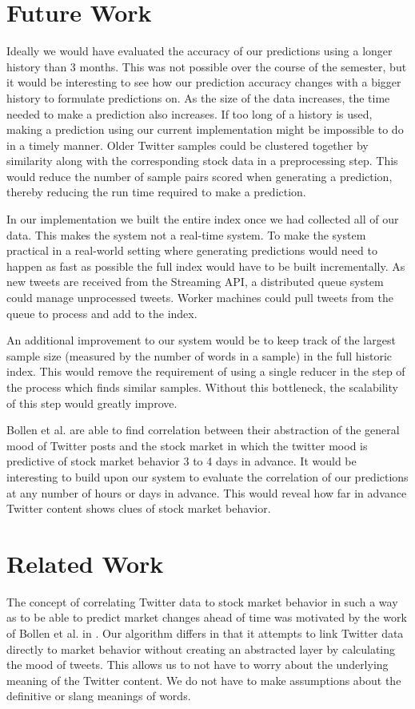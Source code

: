 \documentclass[twocolumn]{article}
\begin{document}
\section{Future Work}
Ideally we would have evaluated the accuracy of our predictions using a longer history than 3 months. This was not possible over the course of the semester, but it would be interesting to see how our prediction accuracy changes with a bigger history to formulate predictions on. As the size of the data increases, the time needed to make a prediction also increases. If too long of a history is used, making a prediction using our current implementation might be impossible to do in a timely manner. Older Twitter samples could be clustered together by similarity along with the corresponding stock data in a preprocessing step. This would reduce the number of sample pairs scored when generating a prediction, thereby reducing the run time required to make a prediction.

In our implementation we built the entire index once we had collected all of our data. This makes the system not a real-time system. To make the system practical in a real-world setting where generating predictions would need to happen as fast as possible the full index would have to be built incrementally. As new tweets are received from the Streaming API, a distributed queue system could manage unprocessed tweets. Worker machines could pull tweets from the queue to process and add to the index.

An additional improvement to our system would be to keep track of the largest sample size (measured by the number of words in a sample) in the full historic index. This would remove the requirement of using a single reducer in the step of the process which finds similar samples. Without this bottleneck, the scalability of this step would greatly improve.

Bollen et al. are able to find correlation between their abstraction of the general mood of Twitter posts and the stock market in which the twitter mood is predictive of stock market behavior 3 to 4 days in advance. It would be interesting to build upon our system to evaluate the correlation of our predictions at any number of hours or days in advance. This would reveal how far in advance Twitter content shows clues of stock market behavior.

\section{Related Work}
The concept of correlating Twitter data to stock market behavior in such a way as to be able to predict market changes ahead of time was motivated by the work of Bollen et al. in \cite{bollen}. Our algorithm differs in that it attempts to link Twitter data directly to market behavior without creating an abstracted layer by calculating the mood of tweets. This allows us to not have to worry about the underlying meaning of the Twitter content. We do not have to make assumptions about the definitive or slang meanings of words.
\end{document}
